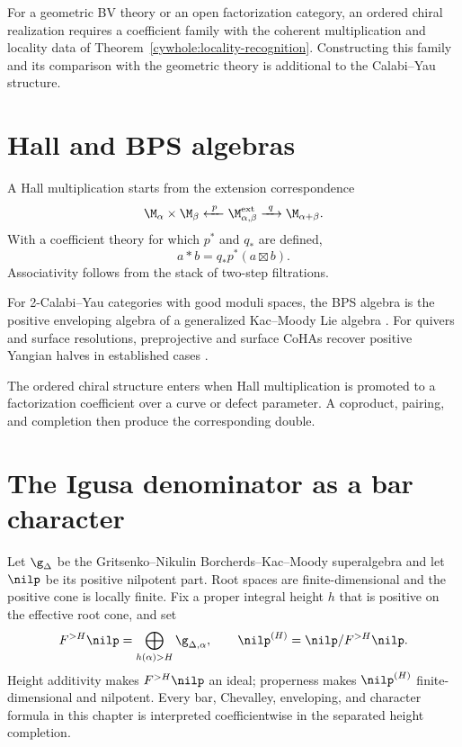 For a geometric BV theory or an open factorization category,
an ordered chiral realization requires a coefficient family
with the coherent multiplication and locality data of
Theorem~\ref{cywhole:locality-recognition}.
Constructing this family and its comparison with the geometric theory
is additional to the Calabi--Yau structure.

\chapter{Hall and BPS algebras}
A Hall multiplication starts from the extension correspondence
\[
 \M_{\alpha}\times\M_{\beta}
 \xleftarrow{\ p\ }\M_{\alpha,\beta}^{\mathrm{ext}}
 \xrightarrow{\ q\ }\M_{\alpha+\beta}.
\]
With a coefficient theory for which $p^*$ and $q_*$ are defined,
\[
 a*b=q_*p^*(a\boxtimes b).
\]
Associativity follows from the stack of two-step filtrations.

For 2-Calabi--Yau categories with good moduli spaces, the BPS algebra is the positive enveloping algebra of a generalized Kac--Moody Lie algebra \cite{DHS}. For quivers and surface resolutions, preprojective and surface CoHAs recover positive Yangian halves in established cases \cite{SVYangians,DPPSSV}.

The ordered chiral structure enters when Hall multiplication is promoted to a factorization coefficient over a curve or defect parameter. A coproduct, pairing, and completion then produce the corresponding double.

\chapter{The Igusa denominator as a bar character}
Let $\g_\Delta$ be the Gritsenko--Nikulin Borcherds--Kac--Moody superalgebra and let $\nilp$ be its positive nilpotent part. Root spaces are finite-dimensional and the positive cone is locally finite. Fix a proper integral height $h$ that is positive on the effective root cone, and set
\[
 F^{>H}\nilp=\bigoplus_{h(\alpha)>H}\g_{\Delta,\alpha},
 \qquad
 \nilp^{(H)}=\nilp/F^{>H}\nilp.
\]
Height additivity makes $F^{>H}\nilp$ an ideal; properness makes $\nilp^{(H)}$ finite-dimensional and nilpotent. Every bar, Chevalley, enveloping, and character formula in this chapter is interpreted coefficientwise in the separated height completion.

